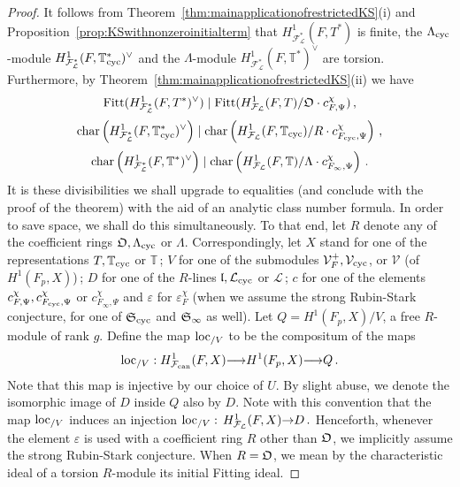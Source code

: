 \documentclass[12pt]{amsart}
\numberwithin{equation}{section}
\begin{document}
\begin{proof} 
It follows from Theorem~\ref{thm:mainapplicationofrestrictedKS}(i) and Proposition~\ref{prop:KSwithnonzeroinitialterm} that $H^1_{{\mathcal{F}}_{\mathcal{L}}^*}(F,T^*)$ is finite, the ${\Lambda}_{\textup{cyc}}$-module $H^1_{{\mathcal{F}}_{\mathcal{L}}^*}(F,{\mathbb{T}}_{\textup{cyc}}^*)^\vee$ and the ${\Lambda}$-module $H^1_{{\mathcal{F}}_{\mathcal{L}}^*}(F,{\mathbb{T}}^*)^\vee$ are torsion. Furthermore, by Theorem~\ref{thm:mainapplicationofrestrictedKS}(ii) we have
$$
\label{eqn:grasstep1}
\textup{Fitt}(H^1_{{\mathcal{F}}_{\mathcal{L}}^*}(F,T^*)^\vee)\mid \textup{Fitt}(H^1_{{\mathcal{F}}_{\mathcal{L}}}(F,T)/{\frak{O}}\cdot c_{F,\Psi}^\chi)\,,
$$
\begin{equation}
\label{eqn:cyclomainconjstep1}
\textup{char}\left(H^1_{{\mathcal{F}}_{\mathcal{L}}^*}(F,{\mathbb{T}}_{\textup{cyc}}^*)^\vee\right)\mid \textup{char}\left(H^1_{{\mathcal{F}}_{\mathcal{L}}}(F,{\mathbb{T}}_{\textup{cyc}})/R\cdot c_{F_{\textup{cyc}},\Psi}^\chi\right)\,,
\end{equation}
$$
\label{eqn:fullmainconjstep1}
\textup{char}\left(H^1_{{\mathcal{F}}_{\mathcal{L}}^*}(F,{\mathbb{T}}^*)^\vee\right)\mid \textup{char}\left(H^1_{{\mathcal{F}}_{\mathcal{L}}}(F,{\mathbb{T}})/{\Lambda}\cdot c_{F_\infty,\Psi}^\chi\right)\,.
$$
It is these divisibilities we shall upgrade to equalities (and conclude with the proof of the theorem) with the aid of an analytic class number formula. In order to save space, we shall do this simultaneously. To that end, let $R$ denote any of the coefficient rings ${\frak{O}}, {\Lambda}_{\textup{cyc}}$ or ${\Lambda}$. Correspondingly, let $X$ stand for one of the representations $T, {\mathbb{T}}_{\textup{cyc}}$ or ${\mathbb{T}}$\,; $V$ for one of the submodules $\mathcal{V}_F^+, \mathcal{V}_{\textup{cyc}}$, or $\mathcal{V}$ (of $H^1(F_p,X)$)\,; $D$ for one of the $R$-lines $\frak{l}, {\mathcal{L}}_{\textup{cyc}}$ or ${\mathcal{L}}$\,; $c$ for one of the elements $c_{F,\Psi}^\chi, c_{F_{\textup{cyc}},\Psi}^\chi$ or $c_{F_\infty,\Psi}^\chi$ and $\varepsilon$ for $\varepsilon_{F}^\chi$ (when we assume the strong Rubin-Stark conjecture, for one of $\frak{S}_{\textup{cyc}}$ and $\frak{S}_\infty$ as well). Let $Q=H^1(F_p,X)/V$, a free $R$-module of rank $g$. Define the map ${\textup{loc}_{/V}}$ to be the compositum of the maps 
$$\textup{loc}_{/V}: H^1_{\mathcal{F}_{\textup{\lowercase{can}}}}(F,X){\longrightarrow} H^1(F_p,X) {\longrightarrow} Q\,.$$
Note that this map is injective by our choice of $U$. By slight abuse, we denote the isomorphic image of $D$ inside $Q$ also by $D$. Note with this convention that the map ${\textup{loc}_{/V}}$ induces an injection ${\textup{loc}_{/V}}:\,H^1_{{\mathcal{F}}_{\mathcal{L}}}(F,X){\rightarrow} D\,.$ Henceforth, whenever the element $\varepsilon$ is used with a coefficient ring $R$ other than ${\frak{O}}$, we implicitly assume the strong Rubin-Stark conjecture. When $R={\frak{O}}$, we mean by the characteristic ideal of a torsion $R$-module its initial Fitting ideal.


\end{proof}
\end{document}
